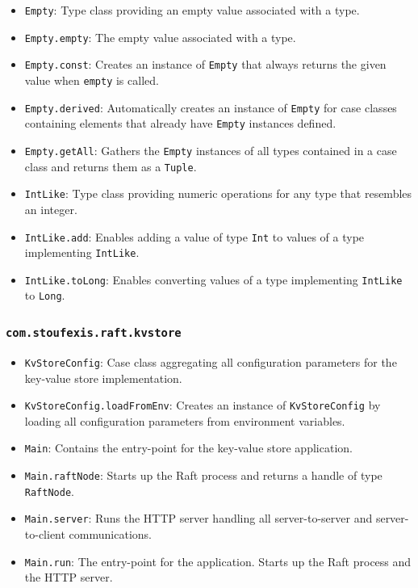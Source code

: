 \begin{itemize}
    \item \lstinline|Empty|: Type class providing an empty value associated with a type.
    \item \lstinline|Empty.empty|: The empty value associated with a type.
    \item \lstinline|Empty.const|: Creates an instance of \lstinline|Empty| that always returns the given value when \lstinline|empty| is called.
    \item \lstinline|Empty.derived|: Automatically creates an instance of \lstinline|Empty| for case classes containing elements that already have \lstinline|Empty| instances defined.
    \item \lstinline|Empty.getAll|: Gathers the \lstinline|Empty| instances of all types contained in a case class and returns them as a \lstinline|Tuple|.
    \item \lstinline|IntLike|: Type class providing numeric operations for any type that resembles an integer.
    \item \lstinline|IntLike.add|: Enables adding a value of type \lstinline|Int| to values of a type implementing \lstinline|IntLike|.
    \item \lstinline|IntLike.toLong|: Enables converting values of a type implementing \lstinline|IntLike| to \lstinline|Long|.
\end{itemize}

\subsubsection{\lstinline|com.stoufexis.raft.kvstore|}

\begin{itemize}
    \item \lstinline|KvStoreConfig|: Case class aggregating all configuration parameters for the key-value store implementation.
    \item \lstinline|KvStoreConfig.loadFromEnv|: Creates an instance of \lstinline|KvStoreConfig| by loading all configuration parameters from environment variables.
    \item \lstinline|Main|: Contains the entry-point for the key-value store application.
    \item \lstinline|Main.raftNode|: Starts up the Raft process and returns a handle of type \lstinline|RaftNode|.
    \item \lstinline|Main.server|: Runs the HTTP server handling all server-to-server and server-to-client communications.
    \item \lstinline|Main.run|: The entry-point for the application. Starts up the Raft process and the HTTP server.
\end{itemize}

